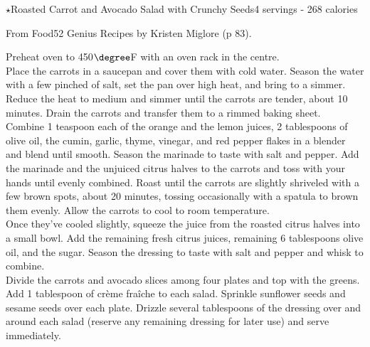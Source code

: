 \begin{recipe}{$\star$Roasted Carrot and Avocado Salad with Crunchy Seeds}{4 servings - 268 calories}{}

\freeform From {\normalfont Food52 Genius Recipes} by Kristen Miglore (p 83).


Preheat oven to 450$\degree$F with an oven rack in the centre.\\

Place the carrots in a saucepan and cover them with cold water. Season the water with a few pinched of salt, set the pan over high heat, and bring to a simmer. Reduce the heat to medium and simmer until the carrots are tender, about 10 minutes. Drain the carrots and transfer them to a rimmed baking sheet.\\

Combine 1 teaspoon each of the orange and the lemon juices, 2 tablespoons of olive oil, the cumin, garlic, thyme, vinegar, and red pepper flakes in a blender and blend until smooth. Season the marinade to taste with salt and pepper. Add the marinade and the unjuiced citrus halves to the carrots and toss with your hands until evenly combined. Roast until the carrots are slightly shriveled with a few brown spots, about 20 minutes, tossing occasionally with a spatula to brown them evenly. Allow the carrots to cool to room temperature.\\

Once they've cooled slightly, squeeze the juice from the roasted citrus halves into a small bowl. Add the remaining fresh citrus juices, remaining 6 tablespoons olive oil, and the sugar. Season the dressing to taste with salt and pepper and whisk to combine.\\

Divide the carrots and avocado slices among four plates and top with the greens. Add 1 tablespoon of crème fraîche to each salad. Sprinkle sunflower seeds and sesame seeds over each plate. Drizzle several tablespoons of the dressing over and around each salad (reserve any remaining dressing for later use) and serve immediately.

\end{recipe}